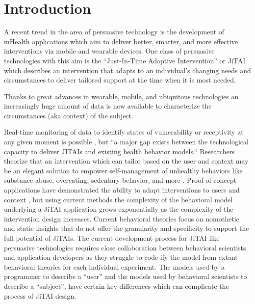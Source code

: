 \documentclass[runningheads,a4paper]{llncs}
\begin{document}
\section{Introduction}
A recent trend in the area of persuasive technology is the development of mHealth applications which aim to deliver better, smarter, and more effective interventions via mobile and wearable devices. 
One class of persuasive technologies with this aim is the “Just-In-Time Adaptive Intervention” or JiTAI which describes an intervention that adapts to an individual’s changing needs and circumstances to deliver tailored support at the time when it is most needed.

Thanks to great advances in wearable, mobile, and ubiquitous technologies an increasingly huge amount of data is now available to characterize the circumstances (aka context) of the subject.

Real-time monitoring of data to identify states of vulnerability or receptivity at any given moment is possible \cite{Hekler, Klasnja, Traver, & Hendriks, 2013}, but “a major gap exists between the technological capacity to deliver JITAIs and existing health behavior models.“ \cite{nahum2014}
Researchers theorize that an intervention which can tailor based on the user and context may be an elegant solution to empower self-management of unhealthy behaviors like substance abuse, overeating, sedentary behavior, and more \cite{nahum2014, Hekler, Patrick, & Michie, 2016}.
Proof-of-concept applications have demonstrated the ability to adapt interventions to users \cite{dallery2014optimizing, beck2010challenges} and context \cite{brailsford2010towards, collins2004}, but using current methods the complexity of the behavioral model underlying a JiTAI application grows exponentially as the complexity of the intervention design increases. 
Current behavioral theories focus on nomothetic and static insights that do not offer the granularity and specificity to support the full potential of JiTAIs\cite{riley2011health}.
The current development process for JiTAI-like persuasive technologies requires close collaboration between behavioral scientists and application developers as they struggle to code-ify the model from extant behavioral theories for each individual experiment.
The models used by a programmer to describe a “user” and the models used by behavioral scientists to describe a “subject”, have certain key differences which can complicate the process of JiTAI design.
\end{document}
